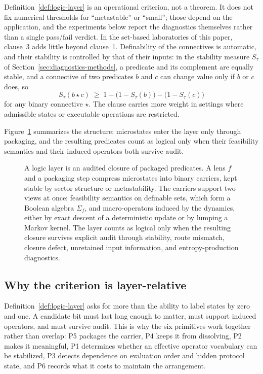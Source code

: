 Definition~\ref{def:logic-layer} is an operational criterion, not a theorem. It does not fix numerical thresholds for ``metastable'' or ``small''; those depend on the application, and the experiments below report the diagnostics themselves rather than a single pass/fail verdict. In the set-based laboratories of this paper, clause~3 adds little beyond clause~1. Definability of the connectives is automatic, and their stability is controlled by that of their inputs: in the stability measure \(S_\tau\) of Section~\ref{sec:diagnostics-methods}, a predicate and its complement are equally stable, and a connective of two predicates \(b\) and \(c\) can change value only if \(b\) or \(c\) does, so
\[
S_\tau(b \star c) \;\ge\; 1-\bigl(1-S_\tau(b)\bigr)-\bigl(1-S_\tau(c)\bigr)
\]
for any binary connective \(\star\). The clause carries more weight in settings where admissible states or executable operations are restricted.

Figure~\ref{fig:logic-layer-overview} summarizes the structure: microstates enter the layer only through packaging, and the resulting predicates count as logical only when their feasibility semantics and their induced operators both survive audit.

\begin{figure}[t]
    \centering
    \resizebox{0.94\linewidth}{!}{}
    \caption{A logic layer is an audited closure of packaged predicates. A lens \(f\) and a packaging step compress microstates into binary carriers, kept stable by sector structure or metastability. The carriers support two views at once: feasibility semantics on definable sets, which form a Boolean algebra \(\Sigma_f\), and macro-operators induced by the dynamics, either by exact descent of a deterministic update or by lumping a Markov kernel. The layer counts as logical only when the resulting closure survives explicit audit through stability, route mismatch, closure defect, unretained input information, and entropy-production diagnostics.}
    \label{fig:logic-layer-overview}
\end{figure}

\subsection{Why the criterion is layer-relative}

Definition~\ref{def:logic-layer} asks for more than the ability to label states by zero and one. A candidate bit must last long enough to matter, must support induced operators, and must survive audit. This is why the six primitives work together rather than overlap: P5 packages the carrier, P4 keeps it from dissolving, P2 makes it meaningful, P1 determines whether an effective operator vocabulary can be stabilized, P3 detects dependence on evaluation order and hidden protocol state, and P6 records what it costs to maintain the arrangement.

